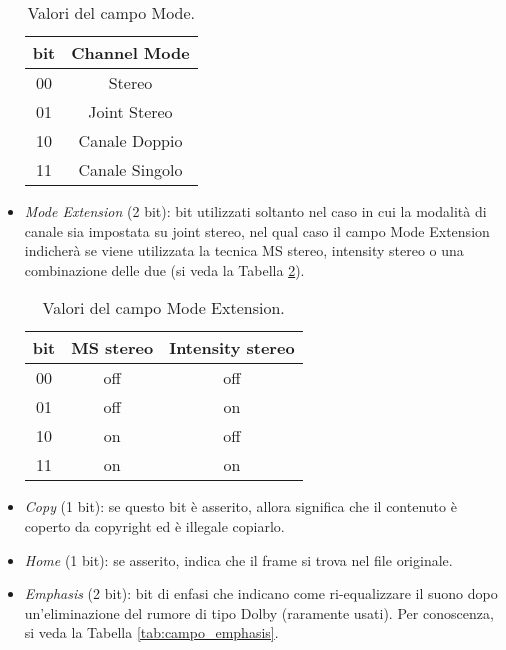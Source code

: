 \begin{itemize}
				\begin{table}[h!]
					\centering
					\begin{tabular}{|c|c|}
						\multicolumn{1}{c}{\textbf{bit}} & \multicolumn{1}{c}{\textbf{Channel Mode}}\\
						\hline
						00 & Stereo\\
						\hline
						01 & Joint Stereo\\
						\hline
						10 & Canale Doppio\\
						\hline
						11 & Canale Singolo\\
						\hline
					\end{tabular}
					\caption{Valori del campo Mode.}
					\label{tab:campo_mode}
				\end{table}
			
			\item \textit{Mode Extension} (2 bit): bit utilizzati soltanto nel caso in cui la modalità di canale sia impostata su joint stereo, nel qual caso il campo Mode Extension indicherà se viene utilizzata la tecnica MS stereo, intensity stereo o una combinazione delle due (si veda la Tabella \ref{tab:campo_mode_extension}).
			
				\begin{table}[h!]
					\centering
					\begin{tabular}{|c|c|c|}
						\multicolumn{1}{c}{\textbf{bit}} & \multicolumn{1}{c}{\textbf{MS stereo}} & \multicolumn{1}{c}{\textbf{Intensity stereo}}\\
						\hline
						00 & off & off\\
						\hline
						01 & off & on\\
						\hline
						10 & on & off\\
						\hline
						11 & on & on\\
						\hline
					\end{tabular}
					\caption{Valori del campo Mode Extension.}
					\label{tab:campo_mode_extension}
				\end{table}
			
			\item \textit{Copy} (1 bit): se questo bit è asserito, allora significa che il contenuto è coperto da copyright ed è illegale copiarlo.
			
			\item \textit{Home} (1 bit): se asserito, indica che il frame si trova nel file originale.
			
			\item \textit{Emphasis} (2 bit): bit di enfasi che indicano come ri-equalizzare il suono dopo un'eliminazione del rumore di tipo Dolby (raramente usati). Per conoscenza, si veda la Tabella \ref{tab:campo_emphasis}.
			

\end{itemize}
